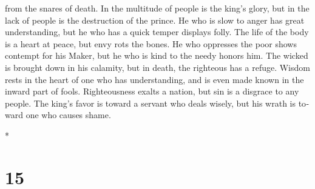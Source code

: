 \begin{paracol}{2}
\begin{otherlanguage}{english}
from the snares of death.  In the multitude of people is
the king's glory, but in the lack of people is the destruction of the
prince.  He who is slow to anger has great understanding,
but he who has a quick temper displays folly.  The life
of the body is a heart at peace, but envy rots the bones.
 He who oppresses the poor shows contempt for his Maker,
but he who is kind to the needy honors him.  The wicked
is brought down in his calamity, but in death, the righteous has a
refuge.  Wisdom rests in the heart of one who has
understanding, and is even made known in the inward part of fools.
 Righteousness exalts a nation, but sin is a disgrace to
any people.  The king's favor is toward a servant who
deals wisely, but his wrath is toward one who causes shame.

\end{otherlanguage}

\switchcolumn[0]*

\hypertarget{section-28}{%
\section{15}\label{section-28}}


\end{paracol}
